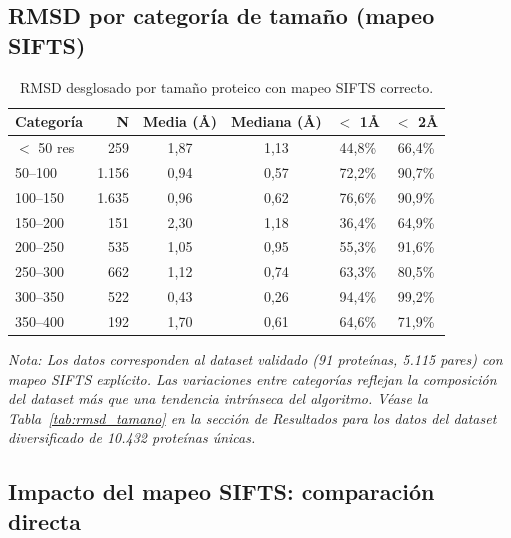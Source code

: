 \subsection{RMSD por categor\'ia de tama\~no (mapeo SIFTS)}

\begin{table}[H]
\centering
\caption{RMSD desglosado por tama\~no proteico con mapeo SIFTS correcto.}
\label{tab:size_breakdown}
\begin{tabular}{@{}lrcccc@{}}
\toprule
\textbf{Categor\'ia} & \textbf{N} & \textbf{Media (\AA)} & \textbf{Mediana (\AA)} & \textbf{$<$ 1\AA} & \textbf{$<$ 2\AA} \\
\midrule
$<$ 50 res & 259 & 1,87 & 1,13 & 44,8\% & 66,4\% \\
50--100 & 1.156 & 0,94 & 0,57 & 72,2\% & 90,7\% \\
100--150 & 1.635 & 0,96 & 0,62 & 76,6\% & 90,9\% \\
150--200 & 151 & 2,30 & 1,18 & 36,4\% & 64,9\% \\
200--250 & 535 & 1,05 & 0,95 & 55,3\% & 91,6\% \\
250--300 & 662 & 1,12 & 0,74 & 63,3\% & 80,5\% \\
300--350 & 522 & 0,43 & 0,26 & 94,4\% & 99,2\% \\
350--400 & 192 & 1,70 & 0,61 & 64,6\% & 71,9\% \\
\bottomrule
\end{tabular}
\end{table}

\textit{Nota: Los datos corresponden al \textit{dataset} validado (91 prote\'inas, 5.115 pares)
con mapeo SIFTS expl\'icito. Las variaciones entre categor\'ias reflejan la composici\'on
del \textit{dataset} m\'as que una tendencia intr\'inseca del algoritmo. V\'ease la
Tabla~\ref{tab:rmsd_tamano} en la secci\'on de Resultados para los datos del
\textit{dataset} diversificado de 10.432 prote\'inas \'unicas.}

\subsection{Impacto del mapeo SIFTS: comparaci\'on directa}

